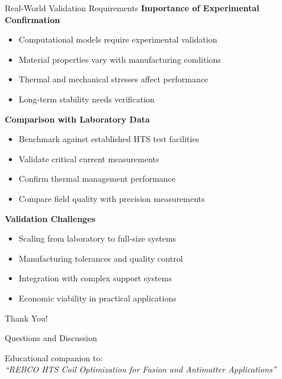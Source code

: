 \documentclass[aspectratio=169,xcolor={table,dvipsnames}]{beamer}
\begin{document}
\begin{frame}{Real-World Validation Requirements}
    \textbf{Importance of Experimental Confirmation}
    \begin{itemize}
        \item Computational models require experimental validation
        \item Material properties vary with manufacturing conditions
        \item Thermal and mechanical stresses affect performance
        \item Long-term stability needs verification
    \end{itemize}
    
    \vspace{0.5cm}
    \textbf{Comparison with Laboratory Data}
    \begin{itemize}
        \item Benchmark against established HTS test facilities
        \item Validate critical current measurements
        \item Confirm thermal management performance
        \item Compare field quality with precision measurements
    \end{itemize}
    
    \vspace{0.5cm}
    \textbf{Validation Challenges}
    \begin{itemize}
        \item Scaling from laboratory to full-size systems
        \item Manufacturing tolerances and quality control
        \item Integration with complex support systems
        \item Economic viability in practical applications
    \end{itemize}
\end{frame}

\begin{frame}
    \begin{center}
        \Huge Thank You!
        
        \vspace{1cm}
        \Large Questions and Discussion
        
        \vspace{1cm}
        \normalsize
        Educational companion to:\\
        \textit{``REBCO HTS Coil Optimization for Fusion and Antimatter Applications''}\\
        \vspace{0.3cm}
    \end{center}
\end{frame}
\end{document}
